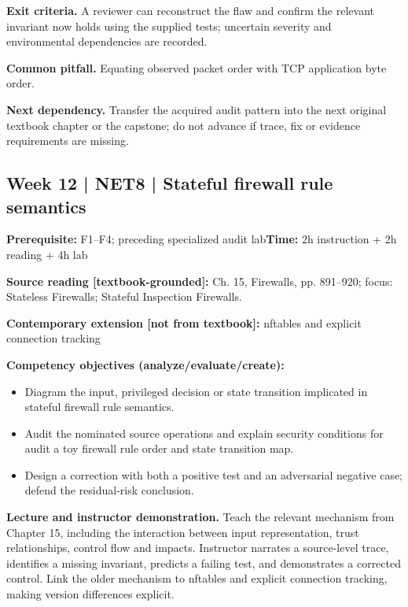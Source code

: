 \documentclass[10pt,letterpaper]{article}
\begin{document}
\textbf{Exit criteria.} A reviewer can reconstruct the flaw and confirm the relevant invariant now holds using the supplied tests; uncertain severity and environmental dependencies are recorded.

\textbf{Common pitfall.} Equating observed packet order with TCP application byte order.

\textbf{Next dependency.} Transfer the acquired audit pattern into the next original textbook chapter or the capstone; do not advance if trace, fix or evidence requirements are missing.

\subsection{Week 12 | NET8 | Stateful firewall rule semantics}
\textbf{Prerequisite:} F1--F4; preceding specialized audit lab\hfill\textbf{Time:} 2h instruction + 2h reading + 4h lab

\textbf{Source reading [textbook-grounded]:} Ch. 15, Firewalls, pp. 891--920; focus: Stateless Firewalls; Stateful Inspection Firewalls.

\textbf{Contemporary extension [not from textbook]:} nftables and explicit connection tracking

\textbf{Competency objectives (analyze/evaluate/create):}
\begin{itemize}[leftmargin=*,itemsep=2pt]
\item Diagram the input, privileged decision or state transition implicated in stateful firewall rule semantics.
\item Audit the nominated source operations and explain security conditions for audit a toy firewall rule order and state transition map.
\item Design a correction with both a positive test and an adversarial negative case; defend the residual-risk conclusion.
\end{itemize}
\textbf{Lecture and instructor demonstration.} Teach the relevant mechanism from Chapter 15, including the interaction between input representation, trust relationships, control flow and impacts. Instructor narrates a source-level trace, identifies a missing invariant, predicts a failing test, and demonstrates a corrected control. Link the older mechanism to nftables and explicit connection tracking, making version differences explicit.
\end{document}
